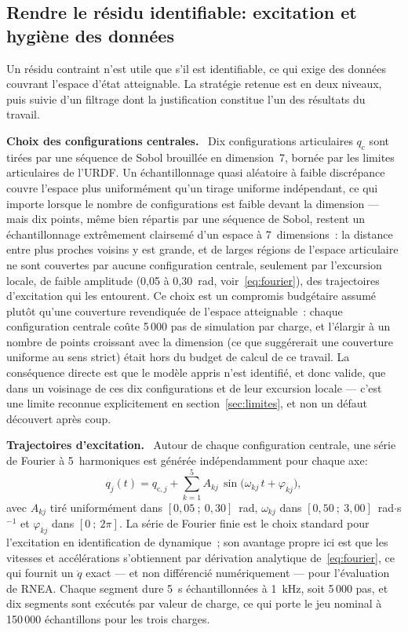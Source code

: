 \documentclass[a4paper, oneside]{article}
\newcommand{\parag}[1]{%
    \par\medskip\noindent\textbf{#1}\ \ignorespaces%
}
\newcommand{\q}{\ensuremath{q}}
\newcommand{\qdd}{\ensuremath{\ddot{q}}}
\begin{document}
\subsection{Rendre le résidu identifiable: excitation et hygiène des données}
\label{sec:donnees}

Un résidu contraint n'est utile que s'il est identifiable, ce qui exige des
données couvrant l'espace d'état atteignable. La stratégie retenue est en deux
niveaux, puis suivie d'un filtrage dont la justification constitue l'un des
résultats du travail.

\parag{Choix des configurations centrales.} Dix configurations articulaires
$\q_{\mathrm{c}}$ sont tirées par une séquence de Sobol brouillée en
dimension~7, bornée par les limites articulaires de l'URDF. Un échantillonnage
quasi aléatoire à faible discrépance couvre l'espace plus uniformément qu'un
tirage uniforme indépendant, ce qui importe lorsque le nombre de
configurations est faible devant la dimension — mais dix points, même bien
répartis par une séquence de Sobol, restent un échantillonnage extrêmement
clairsemé d'un espace à 7~dimensions~: la distance entre plus proches voisins
y est grande, et de larges régions de l'espace articulaire ne sont couvertes
par aucune configuration centrale, seulement par l'excursion locale, de faible
amplitude (0,05 à 0,30~rad, voir~\eqref{eq:fourier}), des trajectoires
d'excitation qui les entourent. Ce choix est un compromis budgétaire assumé
plutôt qu'une couverture revendiquée de l'espace atteignable~: chaque
configuration centrale coûte 5\,000 pas de simulation par charge, et
l'élargir à un nombre de points croissant avec la dimension (ce que
suggérerait une couverture uniforme au sens strict) était hors du budget de
calcul de ce travail. La conséquence directe est que le modèle appris n'est
identifié, et donc valide, que dans un voisinage de ces dix configurations et
de leur excursion locale — c'est une limite reconnue explicitement en
section~\ref{sec:limites}, et non un défaut découvert après coup.

\parag{Trajectoires d'excitation.} Autour de chaque configuration centrale,
une série de Fourier à 5~harmoniques est générée indépendamment pour chaque
axe:
%
\begin{equation}
    \q_j(t) = \q_{\mathrm{c},j}
    + \sum_{k=1}^{5} A_{kj}\,\sin\!\bigl(\omega_{kj}\,t + \varphi_{kj}\bigr),
    \label{eq:fourier}
\end{equation}
%
avec $A_{kj}$ tiré uniformément dans $[0{,}05~;~0{,}30]$~rad,
$\omega_{kj}$ dans $[0{,}50~;~3{,}00]$~rad$\cdot$s$^{-1}$ et $\varphi_{kj}$
dans $[0~;~2\pi]$. La série de Fourier finie est le choix standard pour
l'excitation en identification de dynamique~\cite{deng2024}; son avantage
propre ici est que les vitesses et accélérations s'obtiennent par dérivation
analytique de~\eqref{eq:fourier}, ce qui fournit un $\qdd$ exact — et non
différencié numériquement — pour l'évaluation de RNEA. Chaque segment dure 5~s
échantillonnées à \SI{1}{kHz}, soit 5\,000 pas, et dix segments sont exécutés par
valeur de charge, ce qui porte le jeu nominal à 150\,000 échantillons pour les
trois charges.
\end{document}
